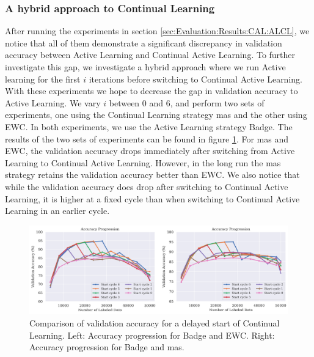 \subsubsection{A hybrid approach to Continual Learning}
\label{sec:Evaluation:Results:CAL:Hybrid}
After running the experiments in section \ref{sec:Evaluation:Results:CAL:ALCL}, we notice that all of them demonstrate a significant discrepancy in validation accuracy between Active Learning and Continual Active Learning. To further investigate this gap,
we investigate a hybrid approach where we run Active learning for the first $i$ iterations before switching to Continual Active Learning. With these experiments we hope to decrease the gap in validation accuracy to Active Learning. We vary $i$ between 0 and 6,
and perform two sets of experiments, one using the Continual Learning strategy \gls{mas} and the other using EWC. In both experiments, we use the Active Learning strategy Badge. The results of the two sets of experiments can be found in figure 
\ref{fig:Evaluation:Results:CAL:DelayedStart}. For \gls{mas} and EWC, the validation accuracy drops immediately after switching from Active Learning to Continual Active Learning. However, in the long run the \gls{mas} strategy retains the validation accuracy better than EWC.
We also notice that while the validation accuracy does drop after switching to Continual Active Learning, it is higher at a fixed cycle than when switching to Continual Active Learning in an earlier cycle. \par

\begin{figure}[h]
    \centering
    \includegraphics[width=\linewidth]{images/results_CAL/Delayed_start_CAL.png}
    \caption[Continual Active Learning Hybrid approach]{Comparison of validation accuracy for a delayed start of Continual Learning. Left: Accuracy progression for Badge and EWC. Right: Accuracy progression for Badge and \gls{mas}.}
    \label{fig:Evaluation:Results:CAL:DelayedStart}
\end{figure}

